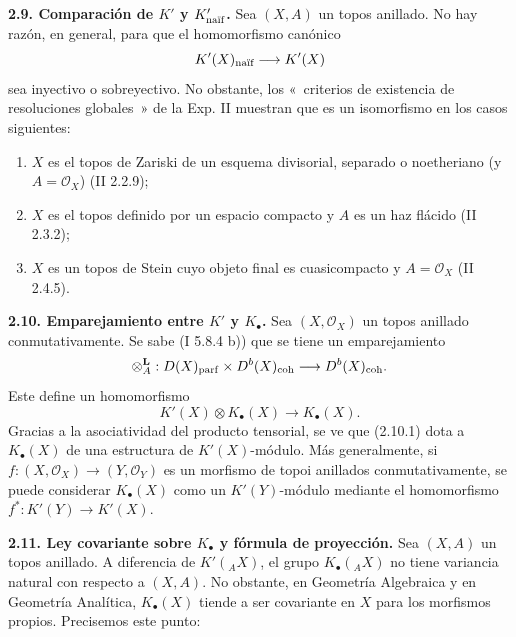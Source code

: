 \providecommand{\sisi}[2]{#2}

\textbf{2.9. Comparación de \(K'\) y \(K'_{\naif}\).} Sea \((X,A)\) un topos anillado. No hay razón, en general, para que el homomorfismo canónico
\[
 K'(X)_{\naif}\longrightarrow K'(X)
\]
sea inyectivo o sobreyectivo. No obstante, los «~criterios de existencia de resoluciones globales~» de la Exp. II muestran que es un isomorfismo en los casos siguientes:
\begin{enumerate}[label=(\roman*)]
\item \(X\) es el topos de Zariski de un esquema divisorial, separado o noetheriano (y \(A=\mathcal O_X\)) (II 2.2.9);
\item \(X\) es el topos definido por un espacio compacto y \(A\) es un haz flácido (II 2.3.2);
\item \(X\) es un topos de Stein cuyo objeto final es cuasicompacto y \(A=\mathcal O_X\) (II 2.4.5).
\end{enumerate}

\textbf{2.10. Emparejamiento entre \(K'\) y \(K_{\bullet}\).} Sea \((X,\mathcal O_X)\) un topos anillado conmutativamente. Se sabe (I 5.8.4 b)) que se tiene un emparejamiento
\[
 \otimes_A^{\mathbf L}:D(X)_{\parf}\times D^b(X)_{\coh}
 \longrightarrow D^b(X)_{\coh}.
\]
Este define un homomorfismo
\begin{equation}\tag{2.10.1}
 K'(X)\otimes K_{\bullet}(X)\longrightarrow K_{\bullet}(X).
\end{equation}
Gracias a la asociatividad del producto tensorial, se ve que (2.10.1) dota a \(K_{\bullet}(X)\) de una estructura de \(K'(X)\)-módulo. Más generalmente, si \(f:(X,\mathcal O_X)\longrightarrow(Y,\mathcal O_Y)\) es un morfismo de topoi anillados conmutativamente, se puede considerar \(K_{\bullet}(X)\) como un \(K'(Y)\)-módulo mediante el homomorfismo \(f^*:K'(Y)\longrightarrow K'(X)\).

\textbf{2.11. Ley covariante sobre \(K_{\bullet}\) y fórmula de proyección.} Sea \((X,A)\) un topos anillado. A diferencia de \(K'({}_A X)\), el grupo \(K_\bullet({}_A X)\) no tiene variancia natural con respecto a \((X,A)\). No obstante, en Geometría Algebraica y en Geometría Analítica, \(K_{\bullet}(X)\) tiende a ser covariante en \(X\) para los morfismos propios. Precisemos este punto:

